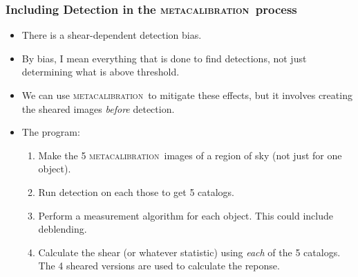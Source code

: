 \documentclass{beamer}
\newcommand{\mcal}{\textsc{metacalibration}}
\begin{document}
\frame
{
    \frametitle{Including Detection in the \mcal\ process}

 
    \begin{itemize}

        \item There is a shear-dependent detection bias.

        \item By bias, I mean everything that is done to find detections,
            not just determining what is above threshold.

        \item We can use \mcal\ to mitigate these effects, but it involves
            creating the sheared images {\em before} detection.

        \item The program:
            \begin{enumerate}

                \item Make the 5 \mcal\ images of a region of sky (not just for
                    one object).

                \item Run detection on each those to get 5 catalogs.

                \item Perform a measurement algorithm for each object.  This
                    could include deblending.

                \item Calculate the shear (or whatever statistic) using {\em
                    each} of the 5 catalogs.  The 4 sheared versions are used
                    to calculate the reponse.

            \end{enumerate}

    \end{itemize}

}
\end{document}
